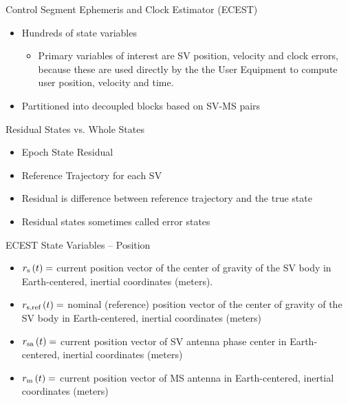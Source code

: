 \documentclass{beamer}
\begin{document}
\begin{frame}
Control Segment Ephemeris and Clock Estimator (ECEST)\\
\begin{itemize}
     \item Hundreds of state variables
     \begin{itemize}
     \item Primary variables of interest are SV position, velocity and clock errors, 
     because these are used directly by the the User Equipment
     to compute user position, velocity and time.
     \end{itemize}
     \item Partitioned into decoupled blocks based on SV-MS pairs 
\end{itemize}
\end{frame}


\begin{frame}
Residual States vs. Whole States\\
\begin{itemize}
  \item Epoch State Residual
  \item Reference Trajectory for each SV
  \item Residual is difference between reference trajectory
  and the true state
  \item Residual states sometimes called error states  
\end{itemize}
\end{frame}

\begin{frame}
ECEST State Variables -- Position\\
\begin{itemize}
  \item $r_{\text{s}}\left(t\right)=$ current position vector of the center of gravity of the SV body in Earth-centered, inertial
coordinates (meters).
  \item $r_{\text{s,ref}}\left(t\right)=$ nominal (reference) position vector of the center of gravity of the SV body in Earth-centered,
inertial coordinates (meters)
  \item $r_{\text{sa}}\left(t\right)=$ current position vector of SV antenna phase center in Earth-centered, inertial
coordinates (meters)
  \item $r_{\text{m}}\left(t\right)=$ current position vector of MS antenna in Earth-centered, inertial coordinates (meters)
\end{itemize}
\end{frame}
\end{document}
